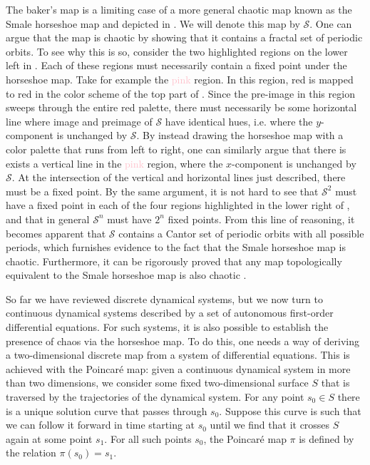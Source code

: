 The baker's map is a limiting case of a more general chaotic map known as the Smale horseshoe map \cite{smale1967differentiable} and depicted in . We will denote this map by $\mathcal{S}$. One can argue that the map is chaotic by showing that it contains a fractal set of periodic orbits. To see why this is so, consider the two highlighted regions on the lower left in . Each of these regions must necessarily contain a fixed point under the horseshoe map. Take for example the \textcolor{pink}{pink} region. In this region, red is mapped to red in the color scheme of the top part of . Since the pre-image in this region sweeps through the entire red palette, there must necessarily be some horizontal line where image and preimage of $\mathcal{S}$ have identical hues, i.e. where the $y$-component is unchanged by $\mathcal{S}$. By instead drawing the horseshoe map with a color palette that runs from left to right, one can similarly argue that there is exists a vertical line in the \textcolor{pink}{pink} region, where the $x$-component is unchanged by $\mathcal{S}$. At the intersection of the vertical and horizontal lines just described, there must be a fixed point. By the same argument, it is not hard to see that $\mathcal{S}^2$ must have a fixed point in each of the four regions highlighted in the lower right of , and that in general $\mathcal{S}^n$ must have $2^n$ fixed points. From this line of reasoning, it becomes apparent that $\mathcal{S}$ contains a Cantor set of periodic orbits with all possible periods, which furnishes evidence to the fact that the Smale horseshoe map is chaotic. Furthermore, it can be rigorously proved that any map topologically equivalent to the Smale horseshoe map is also chaotic \cite{guckenheimer2013nonlinear}. 


So far we have reviewed discrete dynamical systems, but we now turn to continuous dynamical systems described by a set of autonomous first-order differential equations. For such systems, it is also possible to establish the presence of chaos via the horseshoe map. To do this, one needs a way of deriving a two-dimensional discrete map from a system of differential equations. This is achieved with the Poincar\'e map: given a continuous dynamical system in more than two dimensions, we consider some fixed two-dimensional surface $S$ that is traversed by the trajectories of the dynamical system. For any point $s_0 \in S$ there is a unique solution curve that passes through $s_0$. Suppose this curve is such that we can follow it forward in time starting at $s_0$ until we find that it crosses $S$ again at some point $s_1$. For all such points $s_0$, the Poincar\'e map $\pi$ is defined by the relation $\pi(s_0) = s_1$.

